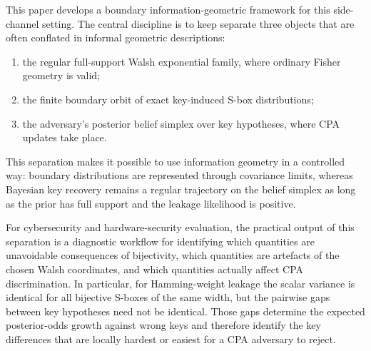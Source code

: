 \documentclass[referee,lineno,pdflatex,sn-mathphys-num]{sn-jnl}
\theoremstyle{thmstylethree}
\theoremstyle{thmstyletwo}
\theoremstyle{thmstyleone}
\begin{document}
This paper develops a boundary information-geometric framework for this
side-channel setting.  The central discipline is to keep separate three
objects that are often conflated in informal geometric descriptions:
\begin{enumerate}[label=\normalfont(\roman*)]
  \item the regular full-support Walsh exponential family, where ordinary
  Fisher geometry is valid;
  \item the finite boundary orbit of exact key-induced S-box distributions;
  \item the adversary's posterior belief simplex over key hypotheses, where
  CPA updates take place.
\end{enumerate}
This separation makes it possible to use information geometry in a controlled
way: boundary distributions are represented through covariance limits, whereas
Bayesian key recovery remains a regular trajectory on the belief simplex as
long as the prior has full support and the leakage likelihood is positive.

For cybersecurity and hardware-security evaluation, the practical output of
this separation is a
diagnostic workflow for identifying which quantities are unavoidable
consequences of bijectivity, which quantities are artefacts of the chosen
Walsh coordinates, and which quantities actually affect CPA discrimination.
In particular, for Hamming-weight leakage the scalar variance is identical for
all bijective S-boxes of the same width, but the pairwise gaps between key
hypotheses need not be identical.  Those gaps determine the expected
posterior-odds growth against wrong keys and therefore identify the key
differences that are locally hardest or easiest for a CPA adversary to reject.
\end{document}
